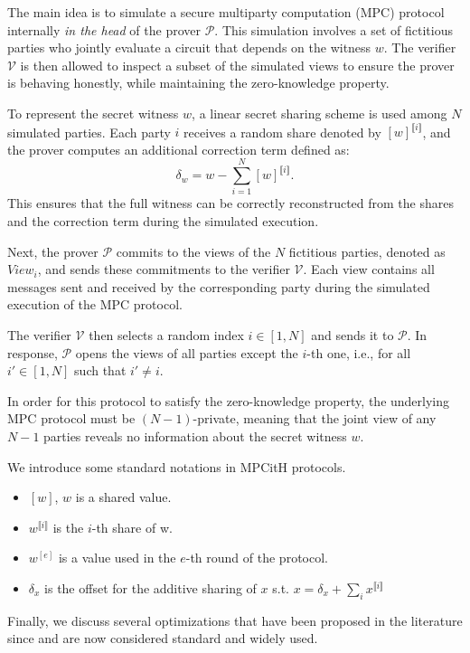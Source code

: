 \documentclass[english]{article}
\newcommand{\lir}{\llbracket i \rrbracket}
\begin{document}
		The main idea is to simulate a secure multiparty computation (MPC) protocol internally \textit{in the head} of the prover $\mathcal{P}$. This simulation involves a set of fictitious parties who jointly evaluate a circuit that depends on the witness $w$. The verifier $\mathcal{V}$ is then allowed to inspect a subset of the simulated views to ensure the prover is behaving honestly, while maintaining the zero-knowledge property.
		
		To represent the secret witness $w$, a linear secret sharing scheme is used among $N$ simulated parties. Each party $i$ receives a random share denoted by $[w]^{\lir}$, and the prover computes an additional correction term defined as:
		$$
		\delta_w = w - \sum_{i=1}^{N} [w]^{\lir}.
		$$
		This ensures that the full witness can be correctly reconstructed from the shares and the correction term during the simulated execution.
		
		Next, the prover $\mathcal{P}$ commits to the views of the $N$ fictitious parties, denoted as $View_i$, and sends these commitments to the verifier $\mathcal{V}$. Each view contains all messages sent and received by the corresponding party during the simulated execution of the MPC protocol.
		
		The verifier $\mathcal{V}$ then selects a random index $i \in [1, N]$ and sends it to $\mathcal{P}$. In response, $\mathcal{P}$ opens the views of all parties except the $i$-th one, i.e., for all $i' \in [1, N]$ such that $i' \neq i$.
		
		In order for this protocol to satisfy the zero-knowledge property, the underlying MPC protocol must be $(N-1)$-private, meaning that the joint view of any $N-1$ parties reveals no information about the secret witness $w$.
		
		We introduce some standard notations in MPCitH protocols. 
		\begin{itemize}
			\item $[w]$, $w$ is a shared value.
			\item $w^{\lir}$ is the $i$-th share of w.
			\item $w^[e]$ is a value used in the $e$-th round of the protocol.
			\item $\delta_x$ is the offset for the additive sharing of $x$ s.t. $x = \delta_x + \sum_i x^{\lir}$
		\end{itemize}
		
		
		Finally, we discuss several optimizations that have been proposed in the literature since and are now considered standard and widely used.
		
\end{document}
